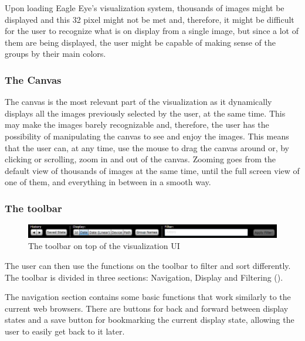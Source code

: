  Upon loading Eagle Eye's visualization system, thousands of images might be displayed and this 32 pixel might not be met and, therefore, it might be difficult for the user to recognize what is on display from a single image, but since a lot of them are being displayed, the user might be capable of making sense of the groups by their main colors.

\subsubsection{The Canvas}

The canvas is the most relevant part of the visualization as it dynamically displays all the images previously selected by the user, at the same time. This may make the images barely recognizable and, therefore, the user has the possibility of manipulating the canvas to see and enjoy the images.
This means that the user can, at any time, use the mouse to drag the canvas around or, by clicking or scrolling, zoom in and out of the canvas. Zooming goes from the default view of thousands of images at the same time, until the full screen view of one of them, and everything in between in a smooth way.

\subsubsection{The toolbar}

\begin{figure}[htbp]
	\centering
		\includegraphics[width=\linewidth]{Figures/toolbar.png}
	\caption{The toolbar on top of the visualization \ac{UI}}
	\label{fig:toolbar}
\end{figure}


The user can then use the functions on the toolbar to filter and sort differently. The toolbar is divided in three sections: Navigation, Display and Filtering ().

The navigation section contains some basic functions that work similarly to the current web browsers. There are buttons for back and forward between display states and a save button for bookmarking the current display state, allowing the user to easily get back to it later.

